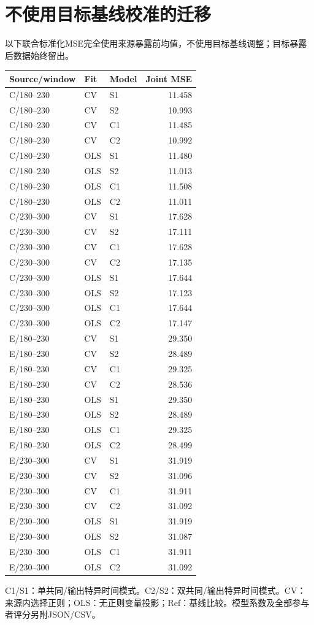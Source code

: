 \documentclass[11pt,a4paper]{article}
\begin{document}
\section{不使用目标基线校准的迁移}
以下联合标准化MSE完全使用来源暴露前均值，不使用目标基线调整；目标暴露后数据始终留出。
\small\begin{longtable}{lllr}\toprule Source/window & Fit & Model & Joint MSE\\\midrule\endhead
C/180--230 & CV & S1 & 11.458\\
C/180--230 & CV & S2 & 10.993\\
C/180--230 & CV & C1 & 11.485\\
C/180--230 & CV & C2 & 10.992\\
C/180--230 & OLS & S1 & 11.480\\
C/180--230 & OLS & S2 & 11.013\\
C/180--230 & OLS & C1 & 11.508\\
C/180--230 & OLS & C2 & 11.011\\
C/230--300 & CV & S1 & 17.628\\
C/230--300 & CV & S2 & 17.111\\
C/230--300 & CV & C1 & 17.628\\
C/230--300 & CV & C2 & 17.135\\
C/230--300 & OLS & S1 & 17.644\\
C/230--300 & OLS & S2 & 17.123\\
C/230--300 & OLS & C1 & 17.644\\
C/230--300 & OLS & C2 & 17.147\\
E/180--230 & CV & S1 & 29.350\\
E/180--230 & CV & S2 & 28.489\\
E/180--230 & CV & C1 & 29.325\\
E/180--230 & CV & C2 & 28.536\\
E/180--230 & OLS & S1 & 29.350\\
E/180--230 & OLS & S2 & 28.489\\
E/180--230 & OLS & C1 & 29.325\\
E/180--230 & OLS & C2 & 28.499\\
E/230--300 & CV & S1 & 31.919\\
E/230--300 & CV & S2 & 31.096\\
E/230--300 & CV & C1 & 31.911\\
E/230--300 & CV & C2 & 31.092\\
E/230--300 & OLS & S1 & 31.919\\
E/230--300 & OLS & S2 & 31.087\\
E/230--300 & OLS & C1 & 31.911\\
E/230--300 & OLS & C2 & 31.092\\
\bottomrule\end{longtable}\normalsize
C1/S1：单共同/输出特异时间模式。C2/S2：双共同/输出特异时间模式。CV：来源内选择正则；OLS：无正则变量投影；Ref：基线比较。模型系数及全部参与者评分另附JSON/CSV。
\end{document}
